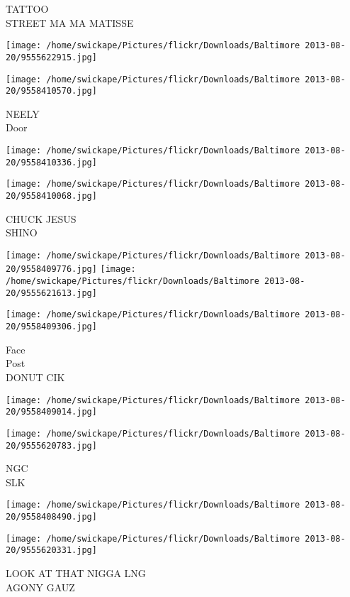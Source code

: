 \documentclass[10pt,letterpaper]{article}
\begin{document}
TATTOO\\
STREET MA MA MATISSE
\pagebreak

\texttt{[image: /home/swickape/Pictures/flickr/Downloads/Baltimore 2013-08-20/9555622915.jpg]}

\vspace{0.25in}
\texttt{[image: /home/swickape/Pictures/flickr/Downloads/Baltimore 2013-08-20/9558410570.jpg]}

NEELY\\
Door
\pagebreak

\texttt{[image: /home/swickape/Pictures/flickr/Downloads/Baltimore 2013-08-20/9558410336.jpg]}

\vspace{0.25in}
\texttt{[image: /home/swickape/Pictures/flickr/Downloads/Baltimore 2013-08-20/9558410068.jpg]}

CHUCK JESUS\\
SHINO
\pagebreak

\texttt{[image: /home/swickape/Pictures/flickr/Downloads/Baltimore 2013-08-20/9558409776.jpg]}
\texttt{[image: /home/swickape/Pictures/flickr/Downloads/Baltimore 2013-08-20/9555621613.jpg]}

\vspace{0.25in}
\texttt{[image: /home/swickape/Pictures/flickr/Downloads/Baltimore 2013-08-20/9558409306.jpg]}

Face\\
Post\\
DONUT CIK
\pagebreak

\texttt{[image: /home/swickape/Pictures/flickr/Downloads/Baltimore 2013-08-20/9558409014.jpg]}

\vspace{0.25in}
\texttt{[image: /home/swickape/Pictures/flickr/Downloads/Baltimore 2013-08-20/9555620783.jpg]}

NGC\\
SLK
\pagebreak

\texttt{[image: /home/swickape/Pictures/flickr/Downloads/Baltimore 2013-08-20/9558408490.jpg]}

\vspace{0.25in}
\texttt{[image: /home/swickape/Pictures/flickr/Downloads/Baltimore 2013-08-20/9555620331.jpg]}

LOOK AT THAT NIGGA LNG\\
AGONY GAUZ
\pagebreak
\end{document}
